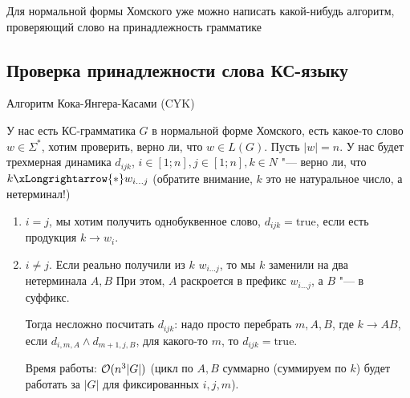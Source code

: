 Для нормальной формы Хомского уже можно написать какой-нибудь алгоритм, проверяющий слово на принадлежность грамматике
\subsection{Проверка принадлежности слова КС-языку}
Алгоритм Кока-Янгера-Касами (CYK)

У нас есть КС-грамматика $G$ в нормальной форме Хомского, есть  какое-то слово $w \in \Sigma^*$, хотим проверить, верно ли, что $w \in L(G)$.
Пусть $|w| = n$. 
У нас будет трехмерная динамика $d_{ijk}$, $i \in [1; n], j \in [1; n], k \in N$ "--- верно ли, что $k \xLongrightarrow{*} w_{i\dots j}$
(обратите внимание, $k$ это не натуральное число, а нетерминал!)

\begin{enumerate}
\item $i = j$, мы хотим получить однобуквенное слово, $d_{ijk} = \text{true}$, если есть продукция $k \to w_i$.
\item $i \neq j$. 
Если реально получили из $k$ $w_{i \dots j}$, то мы $k$ заменили на два нетерминала $A, B$ При этом, $A$ раскроется в префикс $w_{i \dots j}$, а $B$ "--- в суффикс.

Тогда несложно посчитать $d_{ijk}$: надо просто перебрать $m, A, B$, где $k \to AB$, если $d_{i,m,A} \land d_{m+1,j,B}$, для какого-то $m$, то $d_{ijk} = \text{true}$.

Время работы: $\mathcal{O}(n^3 |G|)$ (цикл по $A, B$ суммарно (суммируем по $k$) будет работать за $|G|$ для фиксированных $i, j, m$).
\end{enumerate}